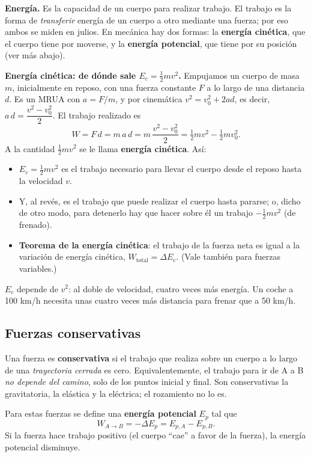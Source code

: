 \documentclass[11pt,a4paper]{article}
\begin{document}
\textbf{Energía.} Es la capacidad de un cuerpo para realizar trabajo. El trabajo es la forma de \emph{transferir} energía de un cuerpo a otro mediante una fuerza; por eso ambos se miden en julios. En mecánica hay dos formas: la \textbf{energía cinética}, que el cuerpo tiene por moverse, y la \textbf{energía potencial}, que tiene por su posición (ver más abajo).

\textbf{Energía cinética: de dónde sale $E_c=\tfrac12mv^2$.} Empujamos un cuerpo de masa $m$, inicialmente en reposo, con una fuerza constante $F$ a lo largo de una distancia $d$. Es un MRUA con $a=F/m$, y por cinemática $v^2=v_0^2+2ad$, es decir, $a\,d=\dfrac{v^2-v_0^2}{2}$. El trabajo realizado es
\[
W=F\,d=m\,a\,d=m\,\frac{v^2-v_0^2}{2}=\tfrac12mv^2-\tfrac12mv_0^2 .
\]
A la cantidad $\tfrac12mv^2$ se le llama \textbf{energía cinética}. Así:
\begin{itemize}[itemsep=1pt]
  \item $E_c=\tfrac12mv^2$ es el trabajo necesario para llevar el cuerpo desde el reposo hasta la velocidad $v$.
  \item Y, al revés, es el trabajo que puede realizar el cuerpo hasta pararse; o, dicho de otro modo, para detenerlo hay que hacer sobre él un trabajo $-\tfrac12mv^2$ (de frenado).
  \item \textbf{Teorema de la energía cinética}: el trabajo de la fuerza neta es igual a la variación de energía cinética, $W_{\text{total}}=\Delta E_c$. (Vale también para fuerzas variables.)
\end{itemize}

\begin{ojo}
$E_c$ depende de $v^2$: al doble de velocidad, cuatro veces más energía. Un coche a 100 km/h necesita unas cuatro veces más distancia para frenar que a 50 km/h.
\end{ojo}

\subsection{Fuerzas conservativas}
Una fuerza es \textbf{conservativa} si el trabajo que realiza sobre un cuerpo a lo largo de una \emph{trayectoria cerrada} es cero. Equivalentemente, el trabajo para ir de A a B \emph{no depende del camino}, solo de los puntos inicial y final. Son conservativas la gravitatoria, la elástica y la eléctrica; el rozamiento no lo es.

Para estas fuerzas se define una \textbf{energía potencial} $E_p$ tal que
\[
W_{A\to B}=-\Delta E_p=E_{p,A}-E_{p,B}.
\]
Si la fuerza hace trabajo positivo (el cuerpo ``cae'' a favor de la fuerza), la energía potencial disminuye.
\end{document}
